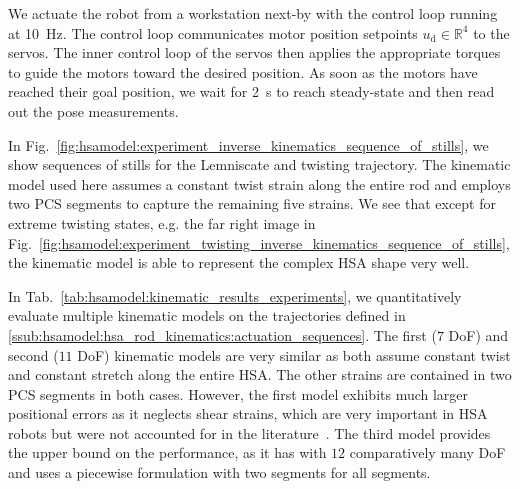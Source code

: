 We actuate the robot from a workstation next-by with the control loop running at \SI{10}{Hz}. The control loop communicates motor position setpoints $u_\mathrm{d} \in \mathbb{R}^4$ to the servos. The inner control loop of the servos then applies the appropriate torques to guide the motors toward the desired position. As soon as the motors have reached their goal position, we wait for \SI{2}{s} to reach steady-state and then read out the pose measurements.

In Fig.~\ref{fig:hsamodel:experiment_inverse_kinematics_sequence_of_stills}, we show sequences of stills for the Lemniscate and twisting trajectory. The kinematic model used here assumes a constant twist strain along the entire rod and employs two \gls{PCS} segments to capture the remaining five strains. We see that except for extreme twisting states, e.g. the far right image in Fig.~\ref{fig:hsamodel:experiment_twisting_inverse_kinematics_sequence_of_stills}, the kinematic model is able to represent the complex \gls{HSA} shape very well.

In Tab.~\ref{tab:hsamodel:kinematic_results_experiments}, we quantitatively evaluate multiple kinematic models on the trajectories defined in \ref{ssub:hsamodel:hsa_rod_kinematics:actuation_sequences}. 
The first ($7$ DoF) and second ($11$ DoF) kinematic models are very similar as both assume constant twist and constant stretch along the entire \gls{HSA}. The other strains are contained in two \gls{PCS} segments in both cases. However, the first model exhibits much larger positional errors as it neglects shear strains, which are very important in \gls{HSA} robots but were not accounted for in the literature~\citep{garg2022kinematic}.
The third model provides the upper bound on the performance, as it has with $12$ comparatively many DoF and uses a piecewise formulation with two segments for all segments. 
